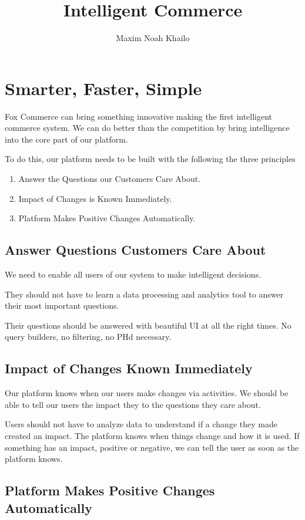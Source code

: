 \documentclass[11pt]{article}
\title{Intelligent Commerce}
\author{Maxim Noah Khailo}
\begin{document}
\maketitle
\section{Smarter, Faster, Simple}

Fox Commerce can bring something innovative making the first intelligent
commerce system. We can do better than the competition by bring intelligence
into the core part of our platform. 

To do this, our platform needs to be built with the following the three principles 
\begin{enumerate}
    \item Answer the Questions our Customers Care About.
    \item Impact of Changes is Known Immediately.
    \item Platform Makes Positive Changes Automatically.
\end{enumerate}

\subsection{Answer Questions Customers Care About}

We need to enable all users of our system to make intelligent decisions. 

They should not have to learn a data processing and analytics tool to answer
their most important questions. 

Their questions should be answered with beautiful UI at all the right times.
No query builders, no filtering, no PHd necessary. 

\subsection{Impact of Changes Known Immediately}

Our platform knows when our users make changes via activities. 
We should be able to tell our users the impact they to the questions they care about.

Users should not have to analyze data to understand if a change they made created an impact. 
The platform knows when things change and how it is used. If something
has an impact, positive or negative, we can tell the user as soon as the platform knows.

\subsection{Platform Makes Positive Changes Automatically}
\end{document}
